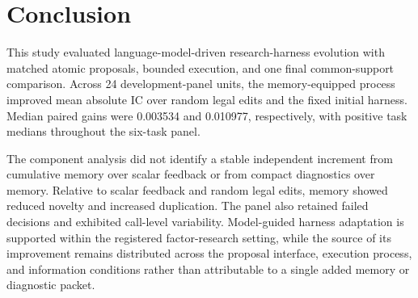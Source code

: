 \section{Conclusion}
\label{sec:conclusion}

This study evaluated language-model-driven research-harness evolution with matched atomic proposals, bounded execution, and one final common-support comparison. Across 24 development-panel units, the memory-equipped process improved mean absolute IC over random legal edits and the fixed initial harness. Median paired gains were 0.003534 and 0.010977, respectively, with positive task medians throughout the six-task panel.

The component analysis did not identify a stable independent increment from cumulative memory over scalar feedback or from compact diagnostics over memory. Relative to scalar feedback and random legal edits, memory showed reduced novelty and increased duplication. The panel also retained failed decisions and exhibited call-level variability. Model-guided harness adaptation is supported within the registered factor-research setting, while the source of its improvement remains distributed across the proposal interface, execution process, and information conditions rather than attributable to a single added memory or diagnostic packet.
